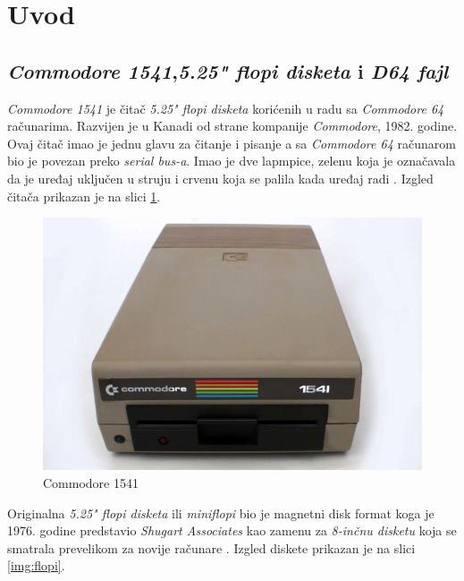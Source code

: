 \section{Uvod}

\subsection{\textit{Commodore 1541},\textit{5.25" flopi disketa} i \textit{D64 fajl}}
\textit{Commodore 1541} je čitač \textit{5.25" flopi disketa} korićenih u radu sa \textit{Commodore 64} računarima. Razvijen je u Kanadi od strane kompanije \textit{Commodore}, 1982. godine. Ovaj čitač imao je jednu glavu za čitanje i pisanje a sa \textit{Commodore 64} računarom bio je povezan preko \textit{serial bus-a}. Imao je dve lapmpice, zelenu koja je označavala da je uređaj uključen u struju i crvenu koja se palila kada uređaj radi \cite{Commodore1541Text}. Izgled čitača prikazan je na slici \ref{img:commodore1541}.
\begin{figure}[ht]
\begin{center}
\includegraphics[width=\textwidth]{img/Commodore1541.jpg}
\caption[Commodore 1541 \textit{(preuzeto \cite{Commodore1541})}]{Commodore 1541}
\label{img:commodore1541}
\end{center}
\end{figure}

Originalna \textit{5.25" flopi disketa} ili \textit{miniflopi} bio je magnetni disk format koga je 1976. godine predstavio \textit{Shugart Associates} kao zamenu za \textit{8-inčnu disketu} koja se smatrala prevelikom za novije računare \cite{5.25Flopi}. Izgled diskete prikazan je na slici \ref{img:flopi}.

